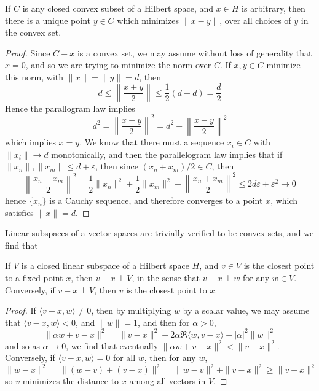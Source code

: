\begin{theorem}
    If $C$ is any closed convex subset of a Hilbert space, and $x \in H$ is arbitrary, then there is a unique point $y \in C$ which minimizes $\| x - y \|$, over all choices of $y$ in the convex set.
\end{theorem}
\begin{proof}
    Since $C - x$ is a convex set, we may assume without loss of generality that $x = 0$, and so we are trying to minimize the norm over $C$. If $x,y \in C$ minimize this norm, with $\| x \| = \| y \| = d$, then
    \[ d \leq \left\| \frac{x + y}{2} \right\| \leq \frac{1}{2}(d + d) = \frac{d}{2} \]
    Hence the parallogram law implies
    \[ d^2 = \left\| \frac{x + y}{2} \right\|^2 = d^2 - \left\| \frac{x - y}{2} \right\|^2 \]
    which implies $x = y$. We know that there must a sequence $x_i \in C$ with $\| x_i \| \to d$ monotonically, and then the parallelogram law implies that if $\| x_n \|, \| x_m \| \leq d + \varepsilon$, then since $(x_n + x_m)/2 \in C$, then
    \[ \left\| \frac{x_n - x_m}{2} \right\|^2 = \frac{1}{2} \| x_n \|^2 + \frac{1}{2} \| x_m \|^2 - \left\| \frac{x_n + x_m}{2} \right\|^2 \leq 2 d \varepsilon + \varepsilon^2 \to 0 \]
    hence $\{ x_n \}$ is a Cauchy sequence, and therefore converges to a point $x$, which satisfies $\| x \| = d$.
\end{proof}

Linear subspaces of a vector spaces are trivially verified to be convex sets, and we find that

\begin{theorem}
    If $V$ is a closed linear subspace of a Hilbert space $H$, and $v \in V$ is the closest point to a fixed point $x$, then $v - x \perp V$, in the sense that $v - x \perp w$ for any $w \in V$. Conversely, if $v - x \perp V$, then $v$ is the closest point to $x$.
\end{theorem}
\begin{proof}
    If $\langle v - x, w \rangle \neq 0$, then by multiplying $w$ by a scalar value, we may assume that $\langle v - x, w \rangle < 0$, and $\| w \| = 1$, and then for $\alpha > 0$,
    \[ \| \alpha w + v - x \|^2 = \| v - x \|^2 + 2 \alpha \Re \langle w, v - x \rangle + |\alpha|^2 \| w \|^2  \]
    and so as $\alpha \to 0$, we find that eventually $\| \alpha w + v - x \|^2 < \| v - x \|^2$. Conversely, if $\langle v - x, w \rangle = 0$ for all $w$, then for any $w$,
    \[ \| w - x \|^2 = \| (w - v) + (v - x) \|^2 = \| w - v \|^2 + \| v - x \|^2 \geq \| v - x \|^2 \]
    so $v$ minimizes the distance to $x$ among all vectors in $V$.
\end{proof}

